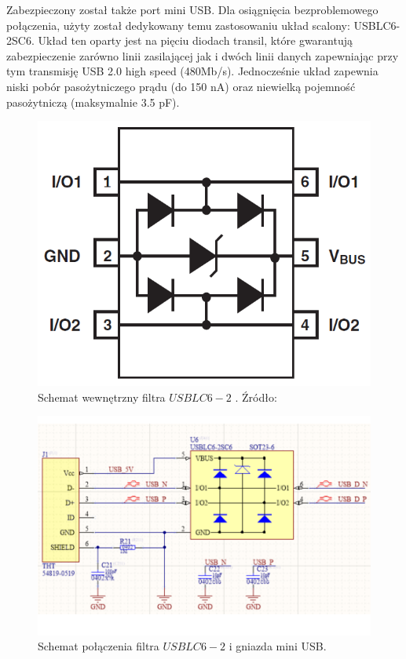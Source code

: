 Zabezpieczony został także port mini USB. Dla osiągnięcia bezproblemowego połączenia, użyty został dedykowany temu zastosowaniu układ scalony: USBLC6-2SC6. Układ ten oparty jest na pięciu diodach transil, które gwarantują zabezpieczenie zarówno linii zasilającej jak i dwóch linii danych zapewniając przy tym transmisję USB 2.0 high speed (480Mb/s).
Jednocześnie układ zapewnia niski pobór pasożytniczego prądu (do 150 nA) oraz niewielką pojemność pasożytniczą (maksymalnie 3.5 pF).

\begin{figure}[H]
    \centering
    \includegraphics[width=0.45\paperwidth]{images/USBLC6-2SC6_internal_schematic.png}
    \caption{Schemat wewnętrzny filtra $USBLC6-2$ . Źródło:\cite{USBLC6-2_datasheet}}
    \label{USBLC6-2SC6_internal_schematic}
\end{figure}


\begin{figure}[H]
    \centering
    \includegraphics[width=0.8\paperwidth]{images/USB_ESD_protection2.png}
    \caption{Schemat połączenia filtra $USBLC6-2$ i gniazda mini USB.}
    \label{USBLC6-2SC6_connection}
\end{figure}

